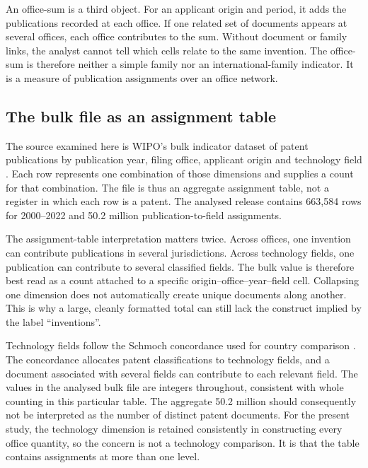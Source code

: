 \documentclass[a4paper,fleqn]{cas-dc}
\begin{document}
An office-sum is a third object. For an applicant origin and period, it adds
the publications recorded at each office. If one related set of documents
appears at several offices, each office contributes to the sum. Without
document or family links, the analyst cannot tell which cells relate to the
same invention. The office-sum is therefore neither a simple family nor an
international-family indicator. It is a measure of publication assignments
over an office network.

\subsection{The bulk file as an assignment table}\label{sec:assignment}

The source examined here is WIPO's bulk indicator dataset of patent
publications by publication year, filing office, applicant origin and
technology field \citep{wipo2025bulk}. Each row represents one combination of
those dimensions and supplies a count for that combination. The file is thus
an aggregate assignment table, not a register in which each row is a patent.
The analysed release contains 663,584 rows for 2000--2022 and 50.2 million
publication-to-field assignments.

The assignment-table interpretation matters twice. Across offices, one
invention can contribute publications in several jurisdictions. Across
technology fields, one publication can contribute to several classified
fields. The bulk value is therefore best read as a count attached to a
specific origin--office--year--field cell. Collapsing one dimension does not
automatically create unique documents along another. This is why a large,
cleanly formatted total can still lack the construct implied by the label
``inventions''.

Technology fields follow the Schmoch concordance used for country comparison
\citep{schmoch2008}. The concordance allocates patent classifications to
technology fields, and a document associated with several fields can
contribute to each relevant field. The values in the analysed bulk file are
integers throughout, consistent with whole counting in this particular table.
The aggregate 50.2 million should consequently not be interpreted as the
number of distinct patent documents. For the present study, the technology
dimension is retained consistently in constructing every office quantity, so
the concern is not a technology comparison. It is that the table contains
assignments at more than one level.
\end{document}
